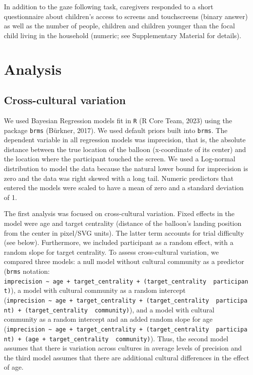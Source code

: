 \documentclass[
  man,floatsintext]{apa7}
\begin{document}
In addition to the gaze following task, caregivers responded to a short questionnaire about children's access to screens and touchscreens (binary answer) as well as the number of people, children and children younger than the focal child living in the household (numeric; see Supplementary Material for details).

\hypertarget{analysis}{%
\section{Analysis}\label{analysis}}

\hypertarget{cross-cultural-variation}{%
\subsection{Cross-cultural variation}\label{cross-cultural-variation}}

We used Bayesian Regression models fit in \texttt{R} (R Core Team, 2023) using the package \texttt{brms} (Bürkner, 2017). We used default priors built into \texttt{brms}. The dependent variable in all regression models was imprecision, that is, the absolute distance between the true location of the balloon (x-coordinate of its center) and the location where the participant touched the screen. We used a Log-normal distribution to model the data because the natural lower bound for imprecision is zero and the data was right skewed with a long tail. Numeric predictors that entered the models were scaled to have a mean of zero and a standard deviation of 1.

The first analysis was focused on cross-cultural variation. Fixed effects in the model were age and target centrality (distance of the balloon's landing position from the center in pixel/SVG units). The latter term accounts for trial difficulty (see below). Furthermore, we included participant as a random effect, with a random slope for target centrality. To assess cross-cultural variation, we compared three models: a null model without cultural community as a predictor (\texttt{brms} notation: \texttt{imprecision\ \textasciitilde{}\ age\ +\ target\_centrality\ +\ (target\_centrality\ \textbar{}\ participant)}), a model with cultural community as a random intercept (\texttt{imprecision\ \textasciitilde{}\ age\ +\ target\_centrality\ +\ (target\_centrality\ \textbar{}\ participant)\ +\ (target\_centrality\ \textbar{}\ community)}), and a model with cultural community as a random intercept and an added random slope for age (\texttt{imprecision\ \textasciitilde{}\ age\ +\ target\_centrality\ +\ (target\_centrality\ \textbar{}\ participant)\ +\ (age\ +\ target\_centrality\ \textbar{}\ community)}). Thus, the second model assumes that there is variation across cultures in average levels of precision and the third model assumes that there are additional cultural differences in the effect of age.
\end{document}
